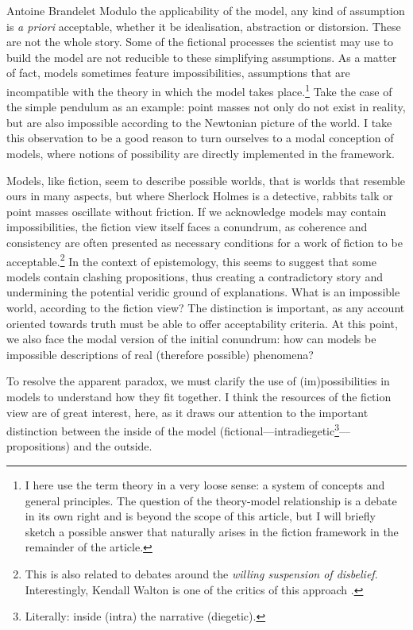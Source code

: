 \begin{artengenv}{Antoine Brandelet}
Modulo the applicability of the model, any kind of assumption is \textit{a priori} acceptable, whether it be idealisation, abstraction or distorsion. These are not the whole story. Some of the fictional processes the scientist may use to build the model are not reducible to these simplifying assumptions. As a matter of fact, models sometimes feature impossibilities, assumptions that are incompatible with the theory in which the model takes place.\footnote{I here use the term theory in a very loose sense: a system of concepts and general principles. The question of the theory-model relationship is a debate in its own right and is beyond the scope of this article, but I will briefly sketch a possible answer that naturally arises in the fiction framework in the remainder of the article.} Take the case of the simple pendulum as an example: point masses not only do not exist in reality, but are also impossible according to the Newtonian picture of the world. I take this observation to be a good reason to turn ourselves to a modal conception of models, where notions of possibility are directly implemented in the framework.

Models, like fiction, seem to describe possible worlds, that is worlds that resemble ours in many aspects, but where Sherlock Holmes is a detective, rabbits talk or point masses oscillate without friction. If we acknowledge models may contain impossibilities, the fiction view itself faces a conundrum, as coherence and consistency are often presented as necessary conditions for a work of fiction to be acceptable.\footnote{This is also related to debates around the \textit{willing suspension of disbelief}. Interestingly, Kendall Walton is one of the critics of this approach \parencite[see e.g.,][p.~7]{Walton1978}.} In the context of epistemology, this seems to suggest that some models contain clashing propositions, thus creating a contradictory story and undermining the potential veridic ground of explanations. What is an impossible world, according to the fiction view? The distinction is important, as any account oriented towards truth must be able to offer acceptability criteria. At this point, we also face the modal version of the initial conundrum: how can models be impossible descriptions of real (therefore possible) phenomena?

To resolve the apparent paradox, we must clarify the use of (im)possibilities in models to understand how they fit together. I think the resources of the fiction view are of great interest, here, as it draws our attention to the important distinction between the inside of the model (fictional---intradiegetic\footnote{Literally: inside (intra) the narrative (diegetic).}---propositions) and the outside.


\end{artengenv}
